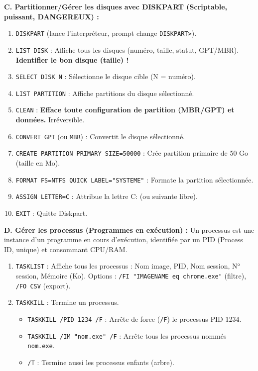 \documentclass[11pt]{article}
\newcommand{\cle}[1]{{\popxbold\color{popdark}#1}}
\begin{document}
\begin{methode}
\textbf{C. Partitionner/Gérer les disques avec DISKPART (Scriptable, puissant, DANGEREUX) :}
\begin{enumerate}
  \item \texttt{DISKPART} (lance l'interpréteur, prompt change \texttt{DISKPART>}).
  \item \texttt{LIST DISK} : Affiche tous les disques (numéro, taille, statut, GPT/MBR). \textbf{Identifier le bon disque (taille) !}
  \item \texttt{SELECT DISK N} : Sélectionne le disque cible (N = numéro).
  \item \texttt{LIST PARTITION} : Affiche partitions du disque sélectionné.
  \item \texttt{CLEAN} : \textbf{Efface toute configuration de partition (MBR/GPT) et données.} Irréversible.
  \item \texttt{CONVERT GPT} (ou \texttt{MBR}) : Convertit le disque sélectionné.
  \item \texttt{CREATE PARTITION PRIMARY SIZE=50000} : Crée partition primaire de 50 Go (taille en Mo).
  \item \texttt{FORMAT FS=NTFS QUICK LABEL="SYSTEME"} : Formate la partition sélectionnée.
  \item \texttt{ASSIGN LETTER=C} : Attribue la lettre C: (ou suivante libre).
  \item \texttt{EXIT} : Quitte Diskpart.
\end{enumerate}

\textbf{D. Gérer les processus (Programmes en exécution) :} Un \cle{processus} est une instance d'un programme en cours d'exécution, identifiée par un \cle{PID} (Process ID, unique) et consommant CPU/RAM.
\begin{enumerate}
  \item \texttt{TASKLIST} : Affiche tous les processus : Nom image, PID, Nom session, N° session, Mémoire (Ko). Options : \texttt{/FI "IMAGENAME eq chrome.exe"} (filtre), \texttt{/FO CSV} (export).
  \item \texttt{TASKKILL} : Termine un processus.
        \begin{itemize}
          \item \texttt{TASKKILL /PID 1234 /F} : Arrête de force (\texttt{/F}) le processus PID 1234.
          \item \texttt{TASKKILL /IM "nom.exe" /F} : Arrête tous les processus nommés \texttt{nom.exe}.
          \item \texttt{/T} : Termine aussi les processus enfants (arbre).
        \end{itemize}
\end{enumerate}


\end{methode}
\end{document}

